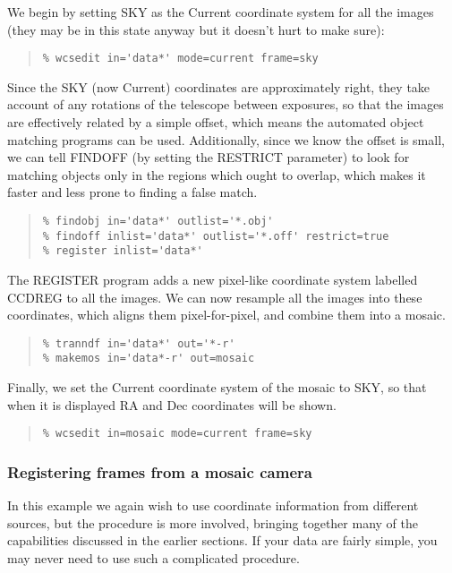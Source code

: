 \documentclass[twoside,11pt]{article}
\newcommand{\latexhtml}[2]{#1}
\renewcommand{\_}{\texttt{\symbol{95}}}
\newcommand{\ttsize}{\latexhtml{\small}{}}
\newenvironment{myquote}{\begin{quote}\ttsize}{\end{quote}}
\begin{document}
We begin by setting SKY as the Current coordinate system for all
the images (they may be in this state anyway
but it doesn't hurt to make sure):
\begin{myquote}
\begin{verbatim}
% wcsedit in='data*' mode=current frame=sky
\end{verbatim}
\end{myquote}
Since the SKY (now Current) coordinates are approximately right,
they take account of any rotations of the telescope between
exposures, so that the images are effectively related by a simple offset,
which means the automated object matching programs can be used.
Additionally, since we know the offset is small,
we can tell FINDOFF (by setting the RESTRICT parameter)
to look for matching objects
only in the regions which ought to overlap, which makes it faster
and less prone to finding a false match.
\begin{myquote}
\begin{verbatim}
% findobj in='data*' outlist='*.obj'
% findoff inlist='data*' outlist='*.off' restrict=true
% register inlist='data*'
\end{verbatim}
\end{myquote}
The REGISTER program adds a new pixel-like coordinate system
labelled CCD\_REG to all the images.
We can now resample all the images into these coordinates, which 
aligns them pixel-for-pixel, and combine them into a mosaic.
\begin{myquote}
\begin{verbatim}
% tranndf in='data*' out='*-r'
% makemos in='data*-r' out=mosaic
\end{verbatim}
\end{myquote}
Finally, we set the Current coordinate system of the mosaic to SKY, so
that when it is displayed RA and Dec coordinates will be shown.
\begin{myquote}
\begin{verbatim}
% wcsedit in=mosaic mode=current frame=sky
\end{verbatim}
\end{myquote}


\subsubsection{\label{mosexnoset}Registering frames from a mosaic camera}

In this example we again wish to use coordinate information from
different sources, but the procedure is more involved, bringing 
together many of the capabilities discussed in the earlier sections.
If your data are fairly simple, you may never need to use such a 
complicated procedure.
\end{document}

